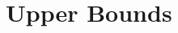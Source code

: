 \documentclass[12pt]{article}
\newcommand{\bE}{\mathbb{E}}
\newcommand {\pr} {\mathbb{P}}
\newcommand{\calD}{{\cal D}}
\newcommand{\calO}{{\cal O}}
\newcommand{\pp}[1]{\left[#1\right]}
\newcommand{\s}[1]{\mathsf{#1}}
\begin{document}

\section{Upper Bounds}\label{sec:upperbounds}
\end{document}
